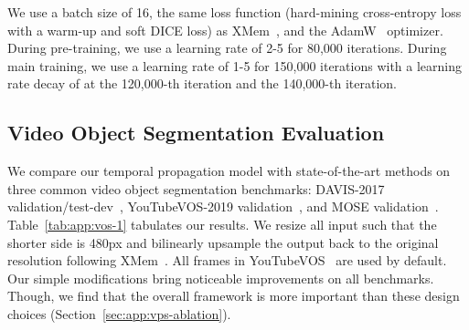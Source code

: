We use a batch size of 16, the same loss function (hard-mining cross-entropy loss with a warm-up and soft DICE loss) as XMem~\cite{cheng2022xmem}, and the AdamW~\cite{loshchilov2017decoupledAdamW} optimizer. During pre-training, we use a learning rate of 2-5 for 80,000 iterations. During main training, we use a learning rate of 1-5 for 150,000 iterations with a learning rate decay of  at the 120,000-th iteration and the 140,000-th iteration.

\subsection{Video Object Segmentation Evaluation}
We compare our temporal propagation model with state-of-the-art methods on three common video object segmentation benchmarks: DAVIS-2017 validation/test-dev~\cite{perazzi2016benchmark}, YouTubeVOS-2019 validation~\cite{xu2018youtubeVOS}, and MOSE validation~\cite{MOSE}. Table~\ref{tab:app:vos-1} tabulates our results.
We resize all input  such that the shorter side is 480px and bilinearly upsample the output back to the original resolution following XMem~\cite{cheng2022xmem}. All frames in YouTubeVOS~\cite{xu2018youtubeVOS} are used by default.
Our simple modifications bring noticeable improvements on all benchmarks. Though, we find that the overall framework is more important than these design choices (Section~\ref{sec:app:vps-ablation}).


